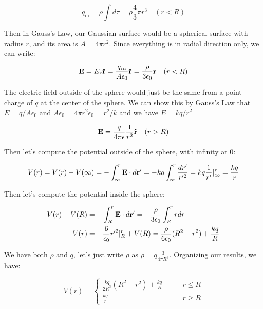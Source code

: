\documentclass{article}
\numberwithin{equation}{section}
\numberwithin{figure}{section}
\newcommand{\vbh}[1]{\vb{\hat{#1}}}
\begin{document}
\begin{equation}
    q_\text{in} = \rho \int d \tau = \rho \frac{4}{3} \pi r^3 \quad (r < R)
\end{equation}

Then in Gauss's Law, our Gaussian surface would be a spherical surface with radius $r$, and its area is $A = 4 \pi r^2$. Since everything is in radial direction only, we can write:

\begin{equation}
    \vb E = E_r \vbh r = \frac{q_{in}}{A \epsilon_0} \vbh r = \frac{\rho}{3 \epsilon_0} \vb r \quad (r < R)
\end{equation}

The electric field outside of the sphere would just be the same from a point charge of $q$ at the center of the sphere. We can show this by Gauss's Law that $E = q / A \epsilon_0$ and $A \epsilon_0 = 4 \pi r^2 \epsilon_0 = r^2 / k$ and we have $E = kq / r^2$

\begin{equation}
    \vb E = \frac{q}{4\pi \epsilon} \frac{1}{r^2} \vbh r \quad (r > R)
\end{equation}

Then let's compute the potential outside of the sphere, with infinity at 0:

\begin{equation}
    V(r) = V(r) - V( \infty) = - \int_{\infty}^r \vb E \cdot d \vb r' = - kq \int^r_\infty \frac{dr'}{r'^2} =  kq \frac{1}{r'} \rvert^r_\infty = \frac{kq}{r}
\end{equation}

Then let's compute the potential inside the sphere:

\begin{equation}
\begin{split}
    V(r) - V(R) &= - \int_R^r \vb E \cdot d \vb r' = - \frac{\rho}{3 \epsilon_0}\int_R^r  r dr \\
    V(r) &= - \frac{6}{\epsilon_0} r'^2 \rvert^r_R + V(R) = \frac{\rho}{6 \epsilon_0} (R^2 - r^2) + \frac{kq}{R}
\end{split}
\end{equation}

We have both $\rho$ and $q$, let's just write $\rho$ as $\rho = q \frac{3}{4\pi R^3}$. Organizing our results, we have:

\begin{equation}
    V (r) = \begin{cases}
        \frac{kq}{2R^3} (R^2 - r^2) + \frac{kq}{R} \quad \quad &r \leq R \\
        \frac{kq}{r} \quad \quad &r \geq R
    \end{cases}
\end{equation}
\end{document}
